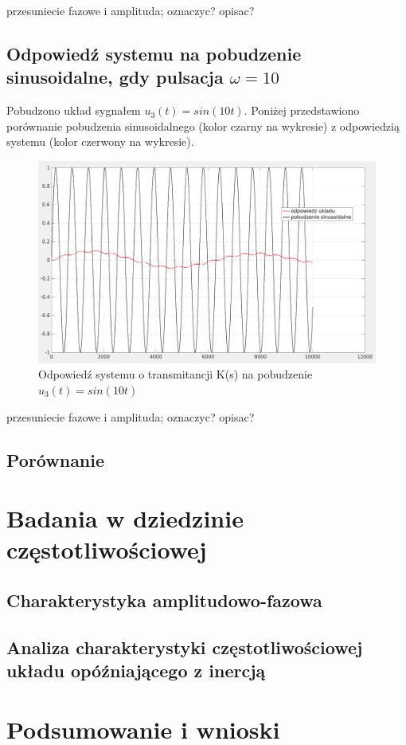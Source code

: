\documentclass[12pt]{article}
\begin{document}
\colorbox{Dandelion}{przesuniecie fazowe i amplituda; oznaczyc? opisac?}

\subsection{Odpowiedź systemu na pobudzenie sinusoidalne, gdy pulsacja $\omega = 10$}
Pobudzono układ sygnałem $u_3(t)=sin(10 t)$. Poniżej przedstawiono porównanie pobudzenia sinusoidalnego (kolor czarny na wykresie) z odpowiedzią systemu (kolor czerwony na wykresie).
\begin{figure}[H]
    \centering
    \includegraphics[scale=0.2]{2.3.png}
    \caption{Odpowiedź systemu o transmitancji K(s) na pobudzenie $u_3(t)=sin(10 t)$}
\end{figure}

\colorbox{Dandelion}{przesuniecie fazowe i amplituda; oznaczyc? opisac?}

\subsection{Porównanie}



\section{Badania w dziedzinie częstotliwościowej}
\subsection{Charakterystyka amplitudowo-fazowa}
\subsection{Analiza charakterystyki częstotliwościowej układu opóźniającego z inercją}

\section{Podsumowanie i wnioski}
\end{document}
